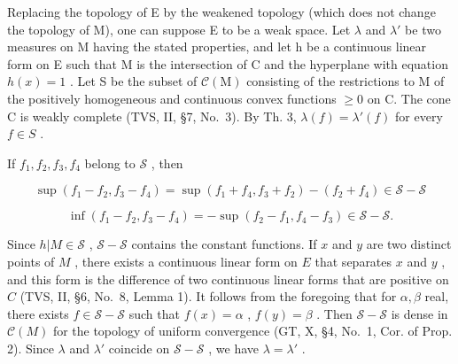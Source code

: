 Replacing the topology of E by the weakened topology (which does not change the topology of M), one can suppose E to be a weak space. Let \(\lambda\) and \(\lambda'\) be two measures on M having the stated properties, and let h be a continuous linear form on E such that M is the intersection of C and the hyperplane with equation \(h(x)=1\) . Let S be the subset of \(\mathcal{C}(\mathrm{M})\) consisting of the restrictions to M of the positively homogeneous and continuous convex functions \(\geqslant0\) on C. The cone C is weakly complete (TVS, II, §7, No.~3). By Th. 3, \(\lambda(f)=\lambda'(f)\) for every \(f\in S\) .

If \(f_{1}, f_{2}, f_{3}, f_{4}\) belong to \(\mathcal{S}\) , then

\[
\sup \left(f _ {1} - f _ {2}, f _ {3} - f _ {4}\right) = \sup \left(f _ {1} + f _ {4}, f _ {3} + f _ {2}\right) - \left(f _ {2} + f _ {4}\right) \in \mathscr {S} - \mathscr {S}
\]

\[
\inf \left(f _ {1} - f _ {2}, f _ {3} - f _ {4}\right) = - \sup \left(f _ {2} - f _ {1}, f _ {4} - f _ {3}\right) \in \mathscr {S} - \mathscr {S}.
\]

Since \(h|M \in \mathcal{S}\) , \(\mathcal{S} - \mathcal{S}\) contains the constant functions. If \(x\) and \(y\) are two distinct points of \(M\) , there exists a continuous linear form on \(E\) that separates \(x\) and \(y\) , and this form is the difference of two continuous linear forms that are positive on \(C\) (TVS, II, §6, No.~8, Lemma 1). It follows from the foregoing that for \(\alpha, \beta\) real, there exists \(f \in \mathcal{S} - \mathcal{S}\) such that \(f(x) = \alpha\) , \(f(y) = \beta\) . Then \(\mathcal{S} - \mathcal{S}\) is dense in \(\mathcal{C}(M)\) for the topology of uniform convergence (GT, X, §4, No.~1, Cor. of Prop. 2). Since \(\lambda\) and \(\lambda'\) coincide on \(\mathcal{S} - \mathcal{S}\) , we have \(\lambda = \lambda'\) .

